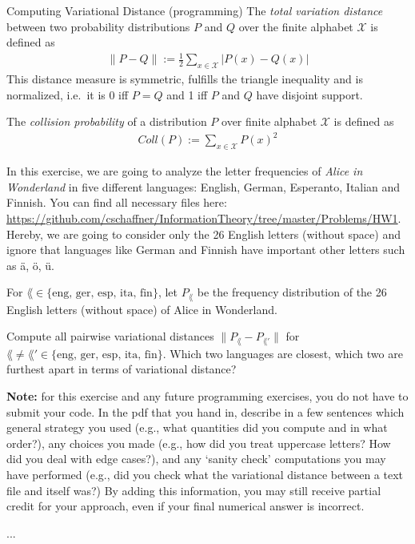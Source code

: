 \documentclass[a4paper,10pt]{article}
\begin{document}
\begin{nproblem}{8}{Computing Variational Distance (programming)}
The \emph{total variation distance} between two probability distributions $P$ and $Q$
over the finite alphabet $\mathcal{X}$ is defined as 
\begin{align*}
\| P - Q \| := \frac12 \sum_{x \in \mathcal{X} } | P(x) - Q(x) | 
\end{align*}
This distance measure is symmetric, fulfills the triangle inequality and is normalized, i.e.\ it is 0 iff $P=Q$ and 1 iff $P$ and $Q$ have disjoint support.

The \emph{collision probability} of a distribution $P$ over finite alphabet $\mathcal{X}$ is defined as
\begin{align*}
Coll(P) := \sum_{x \in \mathcal{X}} P(x)^2
\end{align*}

In this exercise, we are going to analyze the letter frequencies of \emph{Alice in
  Wonderland} in five different languages: English, German, Esperanto,
Italian and Finnish. You can find all necessary files here: \url{https://github.com/cschaffner/InformationTheory/tree/master/Problems/HW1}. Hereby, we are going to consider only the 26 English letters (without space) and ignore that languages like German and Finnish have important other letters such as {\"a}, {\"o}, {\"u}. 

For $\lang \in \{ \textrm{eng, ger, esp, ita, fin} \}$, let $P_{\lang}$ be the frequency distribution of the 26 English letters (without space) of Alice in Wonderland.

\begin{subproblem}{2}
Compute all pairwise variational distances $\| P_{\lang} - P_{\lang'} \|$ for $\lang \neq \lang' \in \{ \textrm{eng, ger, esp, ita, fin} \}$. Which two languages are closest, which two are furthest apart in terms of variational distance?

\textbf{Note:} for this exercise and any future programming exercises, you do not have to submit your code. In the pdf that you hand in, describe in a few sentences which general strategy you used (e.g., what quantities did you compute and in what order?), any choices you made (e.g., how did you treat uppercase letters? How did you deal with edge cases?), and any `sanity check' computations you may have performed (e.g., did you check what the variational distance between a text file and itself was?) By adding this information, you may still receive partial credit for your approach, even if your final numerical answer is incorrect.
\end{subproblem}
\begin{solution}
...
\end{solution}


\end{nproblem}
\end{document}
